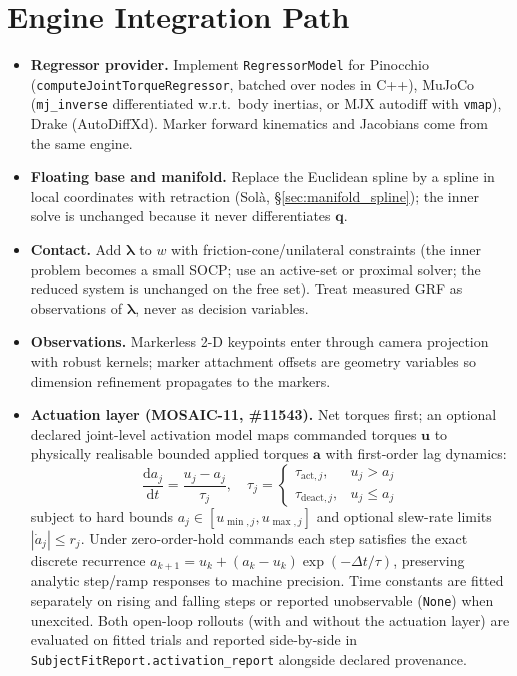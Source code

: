 \documentclass[11pt,a4paper]{article}
\newcommand{\bq}{\mathbf{q}}
\newcommand{\bu}{\mathbf{u}}
\newcommand{\blambda}{\boldsymbol{\lambda}}
\begin{document}
\section{Engine Integration Path}
\label{sec:engines}
\begin{itemize}[nosep]
  \item \textbf{Regressor provider.} Implement \texttt{RegressorModel} for
    Pinocchio (\texttt{computeJointTorqueRegressor}, batched over nodes in
    C++), MuJoCo (\texttt{mj\_inverse} differentiated w.r.t.\ body inertias,
    or MJX autodiff with \texttt{vmap}), Drake (AutoDiffXd).  Marker forward
    kinematics and Jacobians come from the same engine.
  \item \textbf{Floating base and manifold.} Replace the Euclidean spline by a
    spline in local coordinates with retraction (Sol\`a, \S\ref{sec:manifold_spline}); the inner solve is
    unchanged because it never differentiates $\bq$.
  \item \textbf{Contact.} Add $\blambda$ to $w$ with friction-cone/unilateral
    constraints (the inner problem becomes a small SOCP; use an active-set or
    proximal solver; the reduced system is unchanged on the free set).  Treat
    measured GRF as observations of $\blambda$, never as decision variables.
  \item \textbf{Observations.} Markerless 2-D keypoints enter through camera
    projection with robust kernels; marker attachment offsets are geometry
    variables so dimension refinement propagates to the markers.
  \item \textbf{Actuation layer (MOSAIC-11, \#11543).} Net torques first; an
    optional declared joint-level activation model maps commanded torques $\bu$
    to physically realisable bounded applied torques $\mathbf{a}$ with
    first-order lag dynamics:
    \begin{equation}
      \frac{\mathrm{d}a_j}{\mathrm{d}t} = \frac{u_j - a_j}{\tau_j}, \quad
      \tau_j = \begin{cases}
        \tau_{\mathrm{act},j}, & u_j > a_j \\
        \tau_{\mathrm{deact},j}, & u_j \le a_j
      \end{cases}
    \end{equation}
    subject to hard bounds $a_j \in [u_{\min,j}, u_{\max,j}]$ and optional slew-rate
    limits $|\dot{a}_j| \le r_j$.  Under zero-order-hold commands each step
    satisfies the exact discrete recurrence
    $a_{k+1} = u_k + (a_k - u_k)\exp(-\Delta t/\tau)$, preserving analytic
    step/ramp responses to machine precision.  Time constants are fitted
    separately on rising and falling steps or reported unobservable (\texttt{None})
    when unexcited.  Both open-loop rollouts (with and without the actuation
    layer) are evaluated on fitted trials and reported side-by-side in
    \texttt{SubjectFitReport.activation\_report} alongside declared provenance.
\end{itemize}
\end{document}
